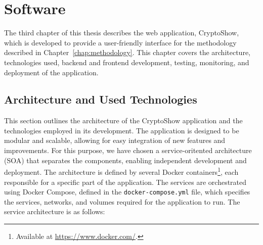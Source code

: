 \chapter{Software}
\label{chap:software}

The third chapter of this thesis describes the web application, CryptoShow, which is developed to provide a user-friendly interface for the methodology described in Chapter~\ref{chap:methodology}. This chapter covers the architecture, technologies used, backend and frontend development, testing, monitoring, and deployment of the application.

\section{Architecture and Used Technologies}
\label{sec:architecture-technologies}

This section outlines the architecture of the CryptoShow application and the technologies employed in its development. The application is designed to be modular and scalable, allowing for easy integration of new features and improvements. For this purpose, we have chosen a service-oritented architecture (SOA) that separates the components, enabling independent development and deployment. The architecture is defined by several Docker containers\footnote{Available at \url{https://www.docker.com/}.}, each responsible for a specific part of the application. The services are orchestrated using Docker Compose, defined in the \lstinline|docker-compose.yml| file, which specifies the services, networks, and volumes required for the application to run. The service architecture is as follows:

